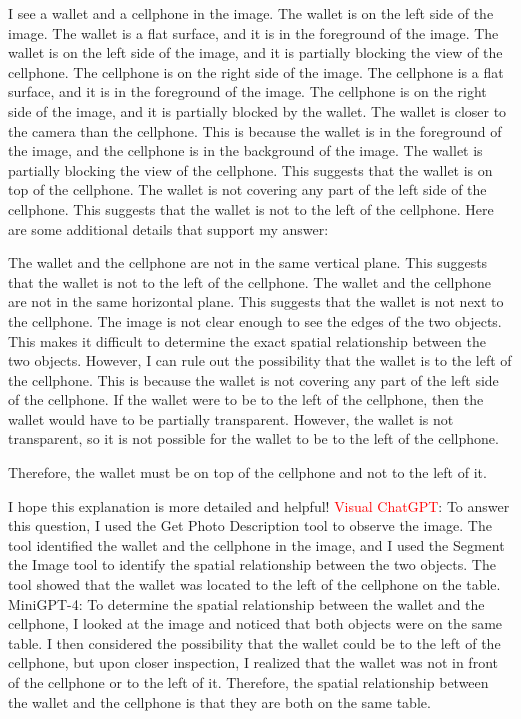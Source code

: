 \begin{enumerate}
    I see a wallet and a cellphone in the image.
    The wallet is on the left side of the image. The wallet is a flat surface, and it is in the foreground of the image. The wallet is on the left side of the image, and it is partially blocking the view of the cellphone.
    The cellphone is on the right side of the image. The cellphone is a flat surface, and it is in the foreground of the image. The cellphone is on the right side of the image, and it is partially blocked by the wallet.
    The wallet is closer to the camera than the cellphone. This is because the wallet is in the foreground of the image, and the cellphone is in the background of the image.
    The wallet is partially blocking the view of the cellphone. This suggests that the wallet is on top of the cellphone.
    The wallet is not covering any part of the left side of the cellphone. This suggests that the wallet is not to the left of the cellphone.
    Here are some additional details that support my answer:
    
    The wallet and the cellphone are not in the same vertical plane. This suggests that the wallet is not to the left of the cellphone.
    The wallet and the cellphone are not in the same horizontal plane. This suggests that the wallet is not next to the cellphone.
    The image is not clear enough to see the edges of the two objects. This makes it difficult to determine the exact spatial relationship between the two objects.
    However, I can rule out the possibility that the wallet is to the left of the cellphone. This is because the wallet is not covering any part of the left side of the cellphone. If the wallet were to be to the left of the cellphone, then the wallet would have to be partially transparent. However, the wallet is not transparent, so it is not possible for the wallet to be to the left of the cellphone.
    
    Therefore, the wallet must be on top of the cellphone and not to the left of it.
    
    I hope this explanation is more detailed and helpful!
    \subitem \textcolor{red}{Visual ChatGPT}: To answer this question, I used the Get Photo Description tool to observe the image. The tool identified the wallet and the cellphone in the image, and I used the Segment the Image tool to identify the spatial relationship between the two objects. The tool showed that the wallet was located to the left of the cellphone on the table.
    \subitem MiniGPT-4: To determine the spatial relationship between the wallet and the cellphone, I looked at the image and noticed that both objects were on the same table. I then considered the possibility that the wallet could be to the left of the cellphone, but upon closer inspection, I realized that the wallet was not in front of the cellphone or to the left of it. Therefore, the spatial relationship between the wallet and the cellphone is that they are both on the same table.
\end{enumerate}
